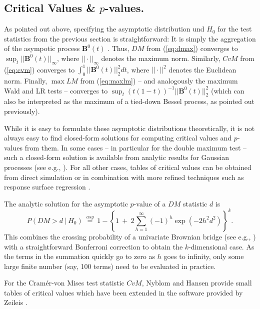 \documentclass[man]{apa}
\begin{document}
\subsection{Critical Values \& $p$-values.}

As pointed out above, specifying the asymptotic distribution und $H_0$ for the test
statistics from the previous section is straightforward: It is simply the aggregation
of the asympotic process ${\bm B}^0(t)$ \cite{HjoKon02,ZeiHor07}. Thus, $\mathit{DM}$
from (\ref{eq:dmax}) converges to $\sup_t || {\bm B}^0(t) ||_{\infty}$, where
$||\cdot||_\infty$ denotes the maximum norm. Similarly, $\mathit{CvM}$
from (\ref{eq:cvm}) converges to $\int_0^1 || {\bm B}^0(t) ||_2^2 d t$, where $||\cdot||^2$
denotes the Euclidean norm. Finally, $\max \mathit{LM}$ from (\ref{eq:maxlm}) -- and analogously
the maximum Wald and LR tests -- converges to $\sup_t (t (1-t))^{-1} || {\bm B}^0(t) ||_2^2$
(which can also be interpreted as the maximum of a tied-down Bessel process, as pointed out
previously).

While it is easy to formulate these asymptotic distributions theoretically,
it is not always easy to find closed-form solutions for computing critical
values and $p$-values from them. In some cases -- in particular for the double maximum test --
such a closed-form solution is available from analytic results for Gaussian
processes (see e.g., ). For all other cases, tables of critical
values can be obtained from direct simulation \cite{Zei06} or in combination with
more refined techniques such as response surface regression \cite{Han97}.

The analytic solution for the asymptotic $p$-value of a $\mathit{DM}$ statistic
$d$ is
\begin{equation}
    \label{eq:absmax_p}
        P(\mathit{DM} > d ~|~ H_0) ~\overset{asy}{=}~ 1 - \left\{1 ~+~ 2 \sum_{h = 1}^{\infty} (-1)^h \exp(-2 h^2 d^2) \right\}^k.
\end{equation}
This combines the crossing probability of a univariate Brownian bridge
(see e.g., ) with a straightforward Bonferroni
correction to obtain the $k$-dimensional case. As the terms in the summation
quickly go to zero as $h$ goes to infinity, only some large finite
number (say, 100 terms) need to be evaluated in practice.

For the Cram\'{e}r-von Mises test statistic $\mathit{CvM}$, Nyblom \citeyear{Nyb89}
and Hansen \citeyear{Han92} provide small tables of critical values which
have been extended in the software provided by Zeileis \citeyear{Zei06}.
\end{document}
